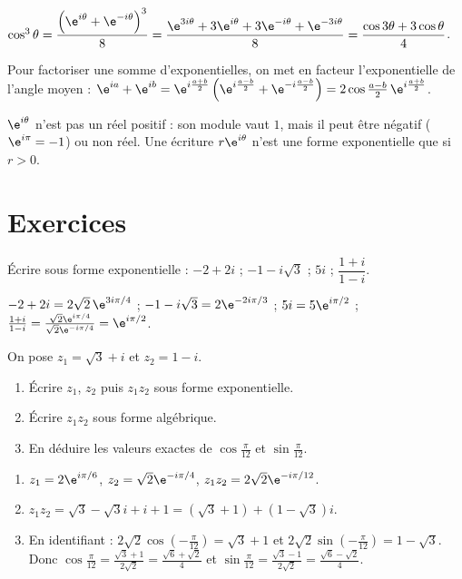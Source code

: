 \begin{method}
$\cos^3\theta=\dfrac{\left(\e^{i\theta}+\e^{-i\theta}\right)^3}{8}=\dfrac{\e^{3i\theta}+3\e^{i\theta}+3\e^{-i\theta}+\e^{-3i\theta}}8=\dfrac{\cos3\theta+3\cos\theta}4$.
\end{method}
\begin{method}
Pour factoriser une somme d'exponentielles, on met en facteur l'exponentielle de l'angle moyen : $\e^{ia}+\e^{ib}=\e^{i\frac{a+b}2}\left(\e^{i\frac{a-b}2}+\e^{-i\frac{a-b}2}\right)=2\cos\frac{a-b}2\,\e^{i\frac{a+b}2}$.
\end{method}
\begin{pitfall}
$\e^{i\theta}$ n'est pas un réel positif : son module vaut $1$, mais il peut être négatif ($\e^{i\pi}=-1$) ou non réel. Une écriture $r\e^{i\theta}$ n'est une forme exponentielle que si $r>0$.
\end{pitfall}

\mxnewpage
\section{Exercices}
\begin{exercise}
Écrire sous forme exponentielle : $-2+2i$ ; $-1-i\sqrt3$ ; $5i$ ; $\dfrac{1+i}{1-i}$.
\end{exercise}
\begin{solution}
$-2+2i=2\sqrt2\,\e^{3i\pi/4}$ ; $-1-i\sqrt3=2\e^{-2i\pi/3}$ ; $5i=5\e^{i\pi/2}$ ; $\frac{1+i}{1-i}=\frac{\sqrt2\e^{i\pi/4}}{\sqrt2\e^{-i\pi/4}}=\e^{i\pi/2}$.
\end{solution}

\begin{exercise}
On pose $z_1=\sqrt3+i$ et $z_2=1-i$.
\begin{enumerate}
\item Écrire $z_1$, $z_2$ puis $z_1z_2$ sous forme exponentielle.
\item Écrire $z_1z_2$ sous forme algébrique.
\item En déduire les valeurs exactes de $\cos\frac\pi{12}$ et $\sin\frac\pi{12}$.
\end{enumerate}
\end{exercise}
\begin{solution}
\begin{enumerate}
\item $z_1=2\e^{i\pi/6}$, $z_2=\sqrt2\e^{-i\pi/4}$, $z_1z_2=2\sqrt2\e^{-i\pi/12}$.
\item $z_1z_2=\sqrt3-\sqrt3i+i+1=\left(\sqrt3+1\right)+\left(1-\sqrt3\right)i$.
\item En identifiant : $2\sqrt2\cos\left(-\frac\pi{12}\right)=\sqrt3+1$ et $2\sqrt2\sin\left(-\frac\pi{12}\right)=1-\sqrt3$. Donc $\cos\frac\pi{12}=\frac{\sqrt3+1}{2\sqrt2}=\frac{\sqrt6+\sqrt2}4$ et $\sin\frac\pi{12}=\frac{\sqrt3-1}{2\sqrt2}=\frac{\sqrt6-\sqrt2}4$.
\end{enumerate}
\end{solution}

